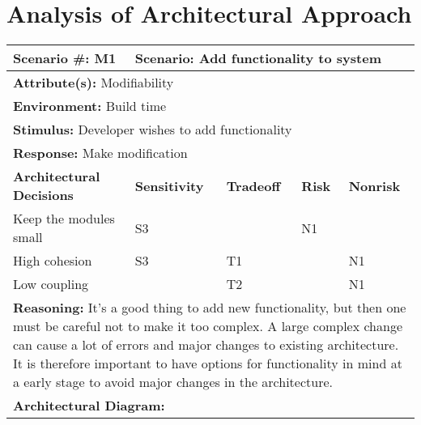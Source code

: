 \section{Analysis of Architectural Approach}

\begin{tabular}{|m{}|m{}|m{}
|m{}|m{}|m{}|}
  \hline
  {\bf Scenario \#:} M1 & \multicolumn{5}{m{0.75 \textwidth}|}{{\bf Scenario:}
  Add functionality to system} \\ \hline
  \multicolumn{6}{|m{0.9 \textwidth}|}{{\bf Attribute(s):} Modifiability}
  \\ \hline
  \multicolumn{6}{|m{0.9 \textwidth}|}{{\bf Environment:} Build time} \\ \hline
  \multicolumn{6}{|m{0.9 \textwidth}|}{{\bf Stimulus:} Developer wishes to add
  functionality} \\ \hline
  \multicolumn{6}{|m{0.9 \textwidth}|}{{\bf Response:} Make modification}
  \\ \hline
  \multicolumn{2}{|m{0.3 \textwidth}|}{\bf Architectural Decisions} &
  {\bf Sensitivity} & {\bf Tradeoff} & {\bf Risk} & {\bf Nonrisk} \\ \hline
  \multicolumn{2}{|m{0.3 \textwidth}|}{Keep the modules small} & S3 &  & N1 &
  \\ \hline
  \multicolumn{2}{|m{0.3 \textwidth}|}{High cohesion} & S3 & T1 &  & N1
  \\ \hline
  \multicolumn{2}{|m{0.3 \textwidth}|}{Low coupling} &  & T2 &  & N1 \\ \hline
  \multicolumn{6}{|m{0.9 \textwidth}|}{{\bf Reasoning:} It's a good thing to
  add new functionality, but then one must be careful not to make it too
  complex. A large complex change can cause a lot of errors and major changes
  to existing architecture. It is therefore important to have options for
  functionality in mind at a early stage to avoid major changes in the
  architecture.} \\ \hline
  \multicolumn{6}{|m{0.9 \textwidth}|}{{\bf Architectural Diagram:} } \\ \hline
\end{tabular}

